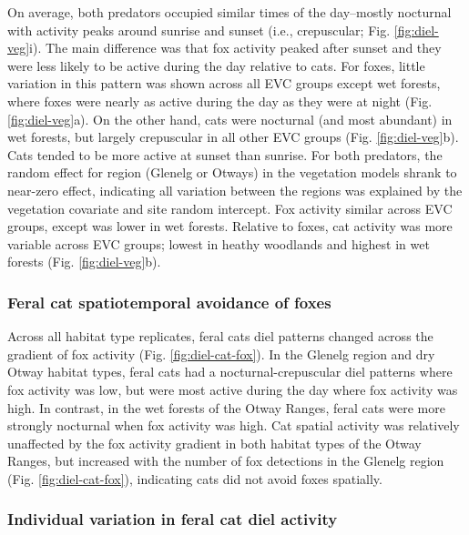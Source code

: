 \documentclass[11pt,a4paper,titlepage,twoside,openright]{style/unimelbthesis}
\begin{document}
\begin{mainmatter}
On average, both predators occupied similar times of the day--mostly nocturnal with activity peaks around sunrise and sunset (i.e., crepuscular; Fig. \ref{fig:diel-veg}i). The main difference was that fox activity peaked after sunset and they were less likely to be active during the day relative to cats. For foxes, little variation in this pattern was shown across all EVC groups except wet forests, where foxes were nearly as active during the day as they were at night (Fig. \ref{fig:diel-veg}a). On the other hand, cats were nocturnal (and most abundant) in wet forests, but largely crepuscular in all other EVC groups (Fig. \ref{fig:diel-veg}b). Cats tended to be more active at sunset than sunrise. For both predators, the random effect for region (Glenelg or Otways) in the vegetation models shrank to near-zero effect, indicating all variation between the regions was explained by the vegetation covariate and site random intercept. Fox activity similar across EVC groups, except was lower in wet forests. Relative to foxes, cat activity was more variable across EVC groups; lowest in heathy woodlands and highest in wet forests (Fig. \ref{fig:diel-veg}b).

\hypertarget{feral-cat-spatiotemporal-avoidance-of-foxes-1}{%
\subsubsection{Feral cat spatiotemporal avoidance of foxes}\label{feral-cat-spatiotemporal-avoidance-of-foxes-1}}

Across all habitat type replicates, feral cats diel patterns changed across the gradient of fox activity (Fig. \ref{fig:diel-cat-fox}). In the Glenelg region and dry Otway habitat types, feral cats had a nocturnal-crepuscular diel patterns where fox activity was low, but were most active during the day where fox activity was high. In contrast, in the wet forests of the Otway Ranges, feral cats were more strongly nocturnal when fox activity was high. Cat spatial activity was relatively unaffected by the fox activity gradient in both habitat types of the Otway Ranges, but increased with the number of fox detections in the Glenelg region (Fig. \ref{fig:diel-cat-fox}), indicating cats did not avoid foxes spatially.

\hypertarget{individual-variation-in-feral-cat-diel-activity-1}{%
\subsubsection{Individual variation in feral cat diel activity}\label{individual-variation-in-feral-cat-diel-activity-1}}


\end{mainmatter}
\end{document}

